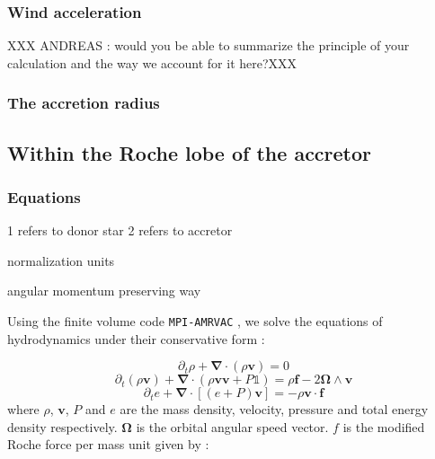 \documentclass{aa}
\begin{document}
\subsubsection{Wind acceleration}
\label{sec:wind_acc}
XXX ANDREAS : would you be able to summarize the principle of your calculation and the way we account for it here?XXX 

\subsubsection{The accretion radius}
\label{sec:acc_rad}

\subsection{Within the Roche lobe of the accretor}
\label{sec:Roche_lobe}

\subsubsection{Equations}
\label{sec:HD_eq}

1 refers to donor star
2 refers to accretor

normalization units

angular momentum preserving way

Using the finite volume code \texttt{MPI-AMRVAC} \citep{Xia2017}, we solve the equations of hydrodynamics under their conservative form :

\begin{equation}
\label{eq:eq1}
\partial _t \rho + \boldsymbol{\nabla} \cdot \left( \rho \mathbf{v} \right) = 0
\end{equation}
\begin{equation}
\label{eq:eq2}
\partial _t \left( \rho \mathbf{v} \right) + \boldsymbol {\nabla} \cdot \left( \rho \mathbf{v} \mathbf{v} + P \mathbb{1} \right) = \rho \mathbf{f} - 2 \boldsymbol{\Omega} \wedge \mathbf{v}
\end{equation}
\begin{equation}
\label{eq:eq3}
\partial _t  e  + \boldsymbol{\nabla} \cdot \left[ \left( e + P \right) \mathbf{v} \right] = - \rho \mathbf{v} \cdot \mathbf{f}
\end{equation}
where $\rho$, $\mathbf{v}$, $P$ and $e$ are the mass density, velocity, pressure and total energy density respectively. $\boldsymbol{\Omega}$ is the orbital angular speed vector. $f$ is the modified Roche force per mass unit given by : 
\end{document}
